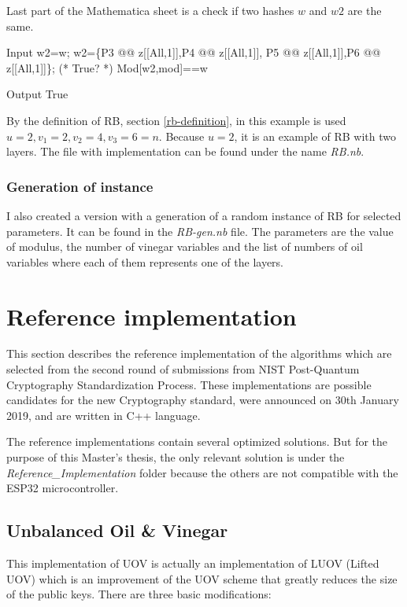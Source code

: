 \documentclass[thesis=M,english]{FITthesis}[2019/12/23]
\begin{document}
\bigskip
\noindent
Last part of the Mathematica sheet is a check if two hashes $w$ and $w2$ are the same.
\begin{mmaCell}[moredefined={w2, w, P5, P6, z, P4, P3, mod}]{Input}
w2=w;
w2=\{P3 @@ z[[All,1]],P4 @@ z[[All,1]],
P5 @@ z[[All,1]],P6 @@ z[[All,1]]\};
(* True? *)
Mod[w2,mod]==w
\end{mmaCell}
\begin{mmaCell}[addtoindex=2]{Output}
True
\end{mmaCell}
By the definition of RB, section \ref{rb-definition}, in this example is used $u=2, v_1=2, v_2=4, v_3=6=n$. Because $u=2$, it is an example of RB with two layers.
The file with implementation can be found under the name \textit{RB.nb}.

\subsubsection{Generation of instance}
I also created a version with a generation of a random instance of RB for selected parameters. It can be found in the \textit{RB-gen.nb} file. The parameters are the value of modulus, the number of vinegar variables and the list of numbers of oil variables where each of them represents one of the layers.

\newpage
\lstset{basicstyle=\footnotesize\ttfamily}
\section{Reference implementation}
This section describes the reference implementation of the algorithms which are selected from the second round of submissions from NIST Post-Quantum Cryptography Standardization Process.\cite{L-NIST-2ND} These implementations are possible candidates for the new Cryptography standard, were announced on 30th January 2019, and are written in C++ language.

\bigskip
\noindent
The reference implementations contain several optimized solutions. But for the purpose of this Master's thesis, the only relevant solution is under the \textit{Reference\_Implementation} folder because the others are not compatible with the ESP32 microcontroller.

\subsection{Unbalanced Oil \& Vinegar}
This implementation of UOV is actually an implementation of LUOV (Lifted UOV) which is an improvement of the UOV scheme that greatly reduces the size of the public keys. There are three basic modifications:
\end{document}

